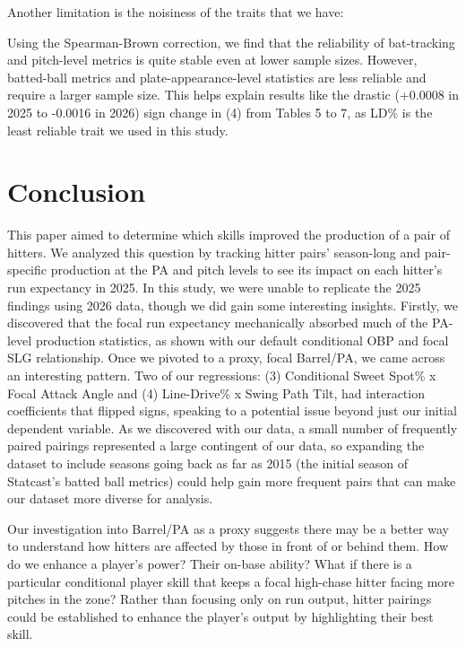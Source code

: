 \documentclass{article}
\newcommand{\tbl}[1]{}
\begin{document}
Another limitation is the noisiness of the traits that we have:

\tbl{trait_reliability}

Using the Spearman-Brown correction, we find that the reliability of bat-tracking and pitch-level metrics is quite stable even at lower sample sizes. However, batted-ball metrics and plate-appearance-level statistics are less reliable and require a larger sample size. This helps explain results like the drastic (+0.0008 in 2025 to -0.0016 in 2026) sign change in (4) from Tables 5 to 7, as LD\% is the least reliable trait we used in this study.

\section{Conclusion}

This paper aimed to determine which skills improved the production of a pair of hitters. We analyzed this question by tracking hitter pairs' season-long and pair-specific production at the PA and pitch levels to see its impact on each hitter's run expectancy in 2025. In this study, we were unable to replicate the 2025 findings using 2026 data, though we did gain some interesting insights. Firstly, we discovered that the focal run expectancy mechanically absorbed much of the PA-level production statistics, as shown with our default conditional OBP and focal SLG relationship. Once we pivoted to a proxy, focal Barrel/PA, we came across an interesting pattern. Two of our regressions: (3) Conditional Sweet Spot\% x Focal Attack Angle and (4) Line-Drive\% x Swing Path Tilt, had interaction coefficients that flipped signs, speaking to a potential issue beyond just our initial dependent variable. As we discovered with our data, a small number of frequently paired pairings represented a large contingent of our data, so expanding the dataset to include seasons going back as far as 2015 (the initial season of Statcast's batted ball metrics) could help gain more frequent pairs that can make our dataset more diverse for analysis.

Our investigation into Barrel/PA as a proxy suggests there may be a better way to understand how hitters are affected by those in front of or behind them. How do we enhance a player's power? Their on-base ability? What if there is a particular conditional player skill that keeps a focal high-chase hitter facing more pitches in the zone? Rather than focusing only on run output, hitter pairings could be established to enhance the player's output by highlighting their best skill.
\end{document}
